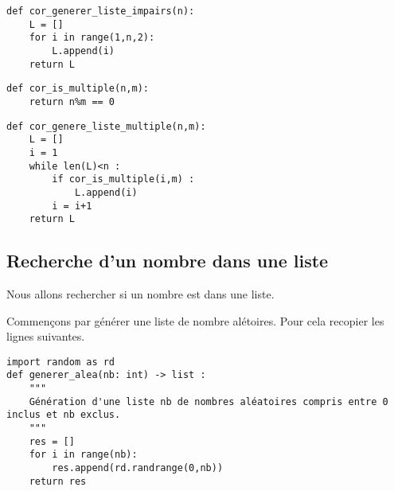 
\begin{lstlisting}
def cor_generer_liste_impairs(n):
    L = []
    for i in range(1,n,2):
        L.append(i)
    return L
\end{lstlisting}


\begin{lstlisting}
def cor_is_multiple(n,m):
    return n%m == 0
\end{lstlisting}




\begin{lstlisting}
def cor_genere_liste_multiple(n,m):
    L = []
    i = 1
    while len(L)<n :
        if cor_is_multiple(i,m) :
            L.append(i)
        i = i+1
    return L

\end{lstlisting}


\subsection*{Recherche d'un nombre dans une liste}


Nous allons rechercher si un nombre est dans une liste. 

Commençons par générer une liste de nombre alétoires. Pour cela recopier les lignes suivantes. 

\begin{lstlisting}
import random as rd
def generer_alea(nb: int) -> list :
    """
    Génération d'une liste nb de nombres aléatoires compris entre 0 inclus et nb exclus.
    """
    res = []
    for i in range(nb):
        res.append(rd.randrange(0,nb))
    return res
\end{lstlisting}




